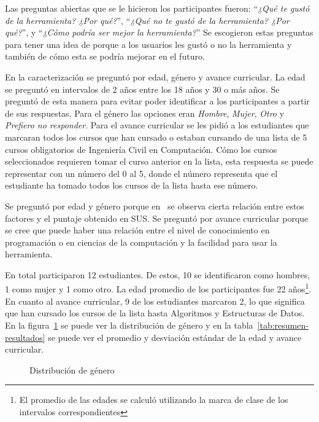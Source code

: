 Las preguntas abiertas que se le hicieron los participantes fueron: ``\textit{¿Qué te gustó de la herramienta? ¿Por qué?}'', ``\textit{¿Qué no te gustó de la herramienta? ¿Por qué?}'', y ``\textit{¿Cómo podría ser mejor la herramienta?}'' Se escogieron estas preguntas para tener una idea de porque a los usuarios les gustó o no la herramienta y también de cómo esta se podría mejorar en el futuro.

En la caracterización se preguntó por edad, género y avance curricular. La edad se preguntó en intervalos de 2 años entre los 18 años y 30 o más años. Se preguntó de esta manera para evitar poder identificar a los participantes a partir de sus respuestas. Para el género las opciones eran \textit{Hombre}, \textit{Mujer}, \textit{Otro} y \textit{Prefiero no responder}. Para el avance curricular se les pidió a los estudiantes que marcaran todos los cursos que han cursado o estaban cursando de una lista de 5 cursos obligatorios de Ingeniería Civil en Computación. Cómo los cursos seleccionados requieren tomar el curso anterior en la lista, esta respuesta se puede representar con un número del 0 al 5, donde el número representa que el estudiante ha tomado todos los cursos de la lista hasta ese número.

Se preguntó por edad y género porque en~\cite{evaluation-of-sus} se observa cierta relación entre estos factores y el puntaje obtenido en SUS. Se preguntó por avance curricular porque se cree que puede haber una relación entre el nivel de conocimiento en programación o en ciencias de la computación y la facilidad para usar la herramienta.

En total participaron 12 estudiantes. De estos, 10 se identificaron como hombres, 1 como mujer y 1 como otro. La edad promedio de los participantes fue 22 años\footnote{El promedio de las edades se calculó utilizando la marca de clase de los intervalos correspondientes}. En cuanto al avance curricular, 9 de los estudiantes marcaron 2, lo que significa que han cursado los cursos de la lista hasta Algoritmos y Estructuras de Datos. En la figura~\ref{fig:genero} se puede ver la distribución de género y en la tabla~\ref{tab:resumen-resultados} se puede ver el promedio y desviación estándar de la edad y avance curricular.

\begin{figure}[hbt]
    \centering
    \caption{Distribución de género}
    \label{fig:genero}
\end{figure}

